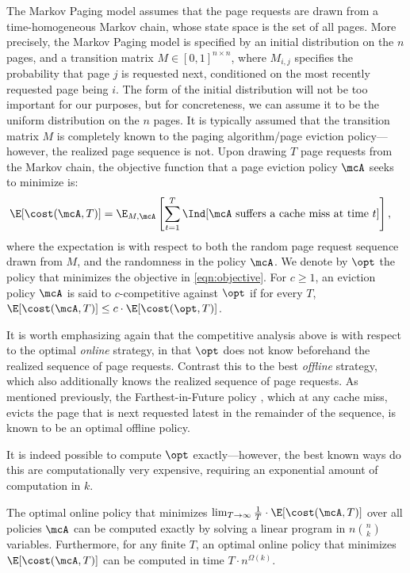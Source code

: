 \documentclass[11pt]{article}
\begin{document}
The Markov Paging model assumes that the page requests are drawn from a time-homogeneous Markov chain, whose state space is the set of all pages. More precisely, the Markov Paging model is specified by an initial distribution on the $n$ pages, and a transition matrix $M \in [0,1]^{n \times n}$, where $M_{i,j}$ specifies the probability that page $j$ is requested next, conditioned on the most recently requested page being $i$. The form of the initial distribution will not be too important for our purposes, but for concreteness, we can assume it to be the uniform distribution on the $n$ pages. It is typically assumed that the transition matrix $M$ is completely known to the paging algorithm/page eviction policy---however, the realized page sequence is not. Upon drawing $T$ page requests from the Markov chain, the objective function that a page eviction policy $\mcA$ seeks to minimize is:
\begin{align}
    \label{eqn:objective}
    \E[\cost(\mcA, T)] &= \E_{M, \mcA}\left[\sum_{t=1}^T\Ind[\text{$\mcA$ suffers a cache miss at time $t$}]\right],
\end{align}
where the expectation is with respect to both the random page request sequence drawn from $M$, and the randomness in the policy $\mcA$. We denote by $\opt$ the policy that minimizes the objective in \eqref{eqn:objective}. For $c \ge 1$, an eviction policy $\mcA$ is said to $c$-competitive against $\opt$ if for every $T$, $ \E[\cost(\mcA, T)] \le c \cdot \E[\cost(\opt, T)]$.

It is worth emphasizing again that the competitive analysis above is with respect to the optimal \textit{online} strategy, in that $\opt$ does not know beforehand the realized sequence of page requests. Contrast this to the best \textit{offline} strategy, which also additionally knows the realized sequence of page requests. As mentioned previously, the Farthest-in-Future policy \citep{belady1966study}, which at any cache miss, evicts the page that is next requested latest in the remainder of the sequence, is known to be an optimal offline policy. 

It is indeed possible to compute $\opt$ exactly---however, the best known ways do this are computationally very expensive, requiring an exponential amount of computation in $k$.

\begin{theorem}
    \label{thm:opt-computation}
    The optimal online policy that minimizes $\lim_{T \to \infty}\frac{1}{T}\cdot\E[\cost(\mcA, T)]$ over all policies $\mcA$ can be computed exactly by solving a linear program in $n\binom{n}{k}$ variables. Furthermore, for any finite $T$, an optimal online policy that minimizes $\E[\cost(\mcA, T)]$ can be computed in time $T \cdot n^{\Omega(k)}$. \end{theorem}
\end{document}
